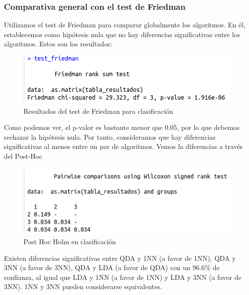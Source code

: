 \subsubsection{Comparativa general con el test de Friedman}

Utilizamos el test de Friedman para comparar globalmente los algoritmos. En él, establecemos como hipótesis nula que no hay diferencias significativas entre los algoritmos. Estos son los resultados:

\begin{figure}[H] %
	\centering
	\includegraphics[scale=0.6]{friedman-c.png}  %
	\caption{Resultados del test de Friedman para clasificación} 
	\label{fig:friedman-c}
\end{figure}

Como podemos ver, el p-valor es bastante menor que 0.05, por lo que debemos rechazar la hipótesis nula. Por tanto, consideramos que hay diferencias significativas al menos entre un par de algoritmos. Vemos la diferencias a través del Post-Hoc

\begin{figure}[H] %
	\centering
	\includegraphics[scale=0.6]{ph-c.png}  %
	\caption{Post Hoc Holm en clasificación} 
	\label{fig:ph-c}
\end{figure}

Existen diferencias significativas entre QDA y 1NN (a favor de 1NN), QDA y 3NN (a favor de 3NN), QDA y LDA (a favor de QDA) con un $96.6\%$ de confianza, al igual que LDA y 1NN (a favor de 1NN) y LDA y 3NN (a favor de 3NN). 1NN y 3NN pueden considerarse equivalentes.

